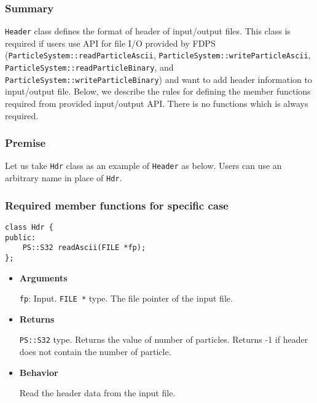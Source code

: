 \subsubsection{Summary}

\texttt{Header} class defines the format of header of input/output files. This class is required if users use API for file I/O provided by FDPS (\texttt{ParticleSystem::readParticleAscii},  \texttt{ParticleSystem::writeParticleAscii}, \texttt{ParticleSystem::readParticleBinary}, and \texttt{ParticleSystem::writeParticleBinary}) and want to add header information to input/output file. Below, we describe the rules for defining the member functions required from provided input/output API. There is no functions which is always required.

\subsubsection{Premise}

Let us take \texttt{Hdr} class as an example of \texttt{Header} as below. Users can use an arbitrary name in place of \texttt{Hdr}.

\subsubsection{Required member functions for specific case}
\label{sec:Hdr_readAscii}

\begin{screen}
\begin{verbatim}
class Hdr {
public:
    PS::S32 readAscii(FILE *fp);
};
\end{verbatim}
\end{screen}

\begin{itemize}

\item {\bf Arguments}

  \texttt{fp}: Input. \texttt{FILE *} type. The file pointer of the input file.

\item {\bf Returns}

  \texttt{PS::S32} type. Returns the value of number of particles. Returns -1 if header does not contain the number of particle.
  
\item {\bf Behavior}

  Read the header data from the input file.

\end{itemize}

